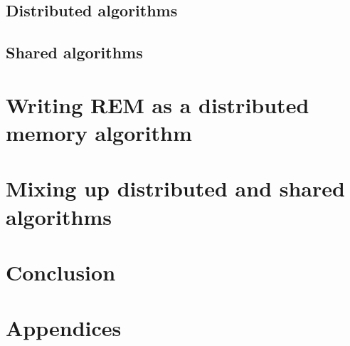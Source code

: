 \documentclass[12px]{article}
\begin{document}
    \subsection{Distributed algorithms}

    \subsection{Shared algorithms}


  \section{Writing REM as a distributed memory algorithm}


  \section{Mixing up distributed and shared algorithms}


  \section{Conclusion}


  \section{Appendices}


  
  
\end{document}
